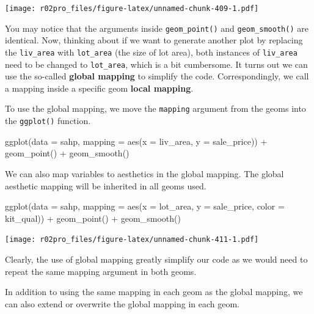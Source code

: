 \documentclass[
]{book}
\newenvironment{Shaded}{\begin{snugshade}}{\end{snugshade}}
\newcommand{\AttributeTok}[1]{\textcolor[rgb]{0.77,0.63,0.00}{#1}}
\newcommand{\FunctionTok}[1]{\textcolor[rgb]{0.00,0.00,0.00}{#1}}
\newcommand{\NormalTok}[1]{#1}
\newcommand{\SpecialCharTok}[1]{\textcolor[rgb]{0.00,0.00,0.00}{#1}}
\begin{document}
\texttt{[image: r02pro\_files/figure-latex/unnamed-chunk-409-1.pdf]}

You may notice that the arguments inside \texttt{geom\_point()} and \texttt{geom\_smooth()} are identical. Now, thinking about if we want to generate another plot by replacing the \texttt{liv\_area} with \texttt{lot\_area} (the size of lot area), both instances of \texttt{liv\_area} need to be changed to \texttt{lot\_area}, which is a bit cumbersome. It turns out we can use the so-called \textbf{global mapping} to simplify the code. Correspondingly, we call a mapping inside a specific geom \textbf{local mapping}.

To use the global mapping, we move the \texttt{mapping} argument from the geoms into the \texttt{ggplot()} function.

\begin{Shaded}
\begin{Highlighting}[]
\FunctionTok{ggplot}\NormalTok{(}\AttributeTok{data =}\NormalTok{ sahp, }\AttributeTok{mapping =} \FunctionTok{aes}\NormalTok{(}\AttributeTok{x =}\NormalTok{ liv\_area, }\AttributeTok{y =}\NormalTok{ sale\_price)) }\SpecialCharTok{+} \FunctionTok{geom\_point}\NormalTok{() }\SpecialCharTok{+} \FunctionTok{geom\_smooth}\NormalTok{()}
\end{Highlighting}
\end{Shaded}

We can also map variables to aesthetics in the global mapping. The global aesthetic mapping will be inherited in all geoms used.

\begin{Shaded}
\begin{Highlighting}[]
\FunctionTok{ggplot}\NormalTok{(}\AttributeTok{data =}\NormalTok{ sahp, }\AttributeTok{mapping =} \FunctionTok{aes}\NormalTok{(}\AttributeTok{x =}\NormalTok{ lot\_area, }\AttributeTok{y =}\NormalTok{ sale\_price, }\AttributeTok{color =}\NormalTok{ kit\_qual)) }\SpecialCharTok{+} \FunctionTok{geom\_point}\NormalTok{() }\SpecialCharTok{+} \FunctionTok{geom\_smooth}\NormalTok{()}
\end{Highlighting}
\end{Shaded}

\texttt{[image: r02pro\_files/figure-latex/unnamed-chunk-411-1.pdf]}

Clearly, the use of global mapping greatly simplify our code as we would need to repeat the same mapping argument in both geoms.

In addition to using the same mapping in each geom as the global mapping, we can also extend or overwrite the global mapping in each geom.
\end{document}
